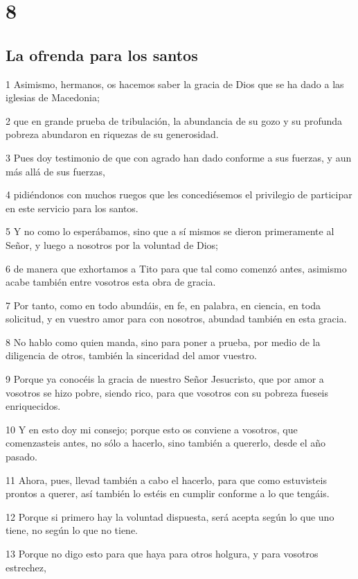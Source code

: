 \chapter{8}

\section*{La ofrenda para los santos}

\par 1 Asimismo, hermanos, os hacemos saber la gracia de Dios que se ha dado a las iglesias de Macedonia;
\par 2 que en grande prueba de tribulación, la abundancia de su gozo y su profunda pobreza abundaron en riquezas de su generosidad.
\par 3 Pues doy testimonio de que con agrado han dado conforme a sus fuerzas, y aun más allá de sus fuerzas,
\par 4 pidiéndonos con muchos ruegos que les concediésemos el privilegio de participar en este servicio para los santos.
\par 5 Y no como lo esperábamos, sino que a sí mismos se dieron primeramente al Señor, y luego a nosotros por la voluntad de Dios;
\par 6 de manera que exhortamos a Tito para que tal como comenzó antes, asimismo acabe también entre vosotros esta obra de gracia.
\par 7 Por tanto, como en todo abundáis, en fe, en palabra, en ciencia, en toda solicitud, y en vuestro amor para con nosotros, abundad también en esta gracia.
\par 8 No hablo como quien manda, sino para poner a prueba, por medio de la diligencia de otros, también la sinceridad del amor vuestro.
\par 9 Porque ya conocéis la gracia de nuestro Señor Jesucristo, que por amor a vosotros se hizo pobre, siendo rico, para que vosotros con su pobreza fueseis enriquecidos.
\par 10 Y en esto doy mi consejo; porque esto os conviene a vosotros, que comenzasteis antes, no sólo a hacerlo, sino también a quererlo, desde el año pasado.
\par 11 Ahora, pues, llevad también a cabo el hacerlo, para que como estuvisteis prontos a querer, así también lo estéis en cumplir conforme a lo que tengáis.
\par 12 Porque si primero hay la voluntad dispuesta, será acepta según lo que uno tiene, no según lo que no tiene.
\par 13 Porque no digo esto para que haya para otros holgura, y para vosotros estrechez,
